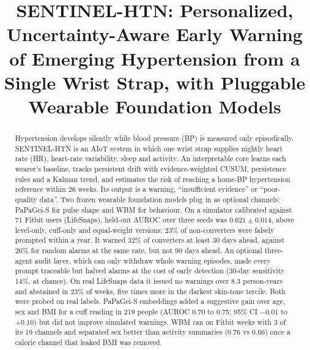 \documentclass[conference]{IEEEtran}
\begin{document}
\title{SENTINEL-HTN: Personalized, Uncertainty-Aware Early Warning of Emerging Hypertension from a Single Wrist Strap, with Pluggable Wearable Foundation Models}

\author{
}

\maketitle

\begin{abstract}
Hypertension develops silently while blood pressure (BP) is measured only episodically. SENTINEL-HTN is an AIoT system in which one wrist strap supplies nightly heart rate (HR), heart-rate variability, sleep and activity. An interpretable core learns each wearer's baseline, tracks persistent drift with evidence-weighted CUSUM, persistence rules and a Kalman trend, and estimates the risk of reaching a home-BP hypertension reference within 26 weeks. Its output is a warning, ``insufficient evidence'' or ``poor-quality data''. Two frozen wearable foundation models plug in as optional channels: PaPaGei-S for pulse shape and WBM for behaviour. On a simulator calibrated against 71 Fitbit users (LifeSnaps), held-out AUROC over three seeds was $0.621\pm0.014$, above level-only, cuff-only and equal-weight versions; 23\% of non-converters were falsely prompted within a year. It warned 32\% of converters at least 30 days ahead, against 26\% for random alarms at the same rate, but not 90 days ahead. An optional three-agent audit layer, which can only withdraw whole warning episodes, made every prompt traceable but halved alarms at the cost of early detection (30-day sensitivity 14\%, at chance). On real LifeSnaps data it issued no warnings over 8.3 person-years and abstained in 23\% of weeks, five times more in the darkest skin-tone tercile. Both were probed on real labels. PaPaGei-S embeddings added a suggestive gain over age, sex and BMI for a cuff reading in 219 people (AUROC 0.70 to 0.75; 95\% CI $-0.01$ to $+0.10$) but did not improve simulated warnings. WBM ran on Fitbit weeks with 3 of its 19 channels and separated sex better than activity summaries (0.76 vs 0.66) once a calorie channel that leaked BMI was removed.
\end{abstract}
\end{document}
